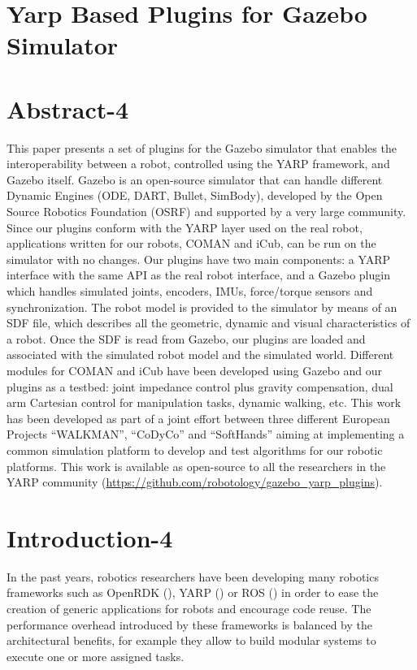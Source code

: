 \section{Yarp Based Plugins for Gazebo Simulator}

\section{Abstract-4}
This paper presents a set of plugins for the Gazebo simulator that enables the interoperability between a robot, controlled using the YARP framework, and Gazebo itself. Gazebo is an open-source simulator that can handle different Dynamic Engines (ODE, DART, Bullet, SimBody), developed by the Open Source Robotics Foundation (OSRF) and supported by a very large community. Since our plugins conform with the YARP layer used on the real robot, applications written for our robots, COMAN and iCub, can be run on the simulator with no changes. Our plugins have two main components: a YARP interface with the same API as the real robot interface, and a Gazebo plugin which handles simulated joints, encoders, IMUs, force/torque sensors and synchronization. The robot model is provided to the simulator by means of an SDF file, which describes all the geometric, dynamic and visual characteristics of a robot.
Once the SDF is read from Gazebo, our plugins are loaded and associated with the simulated robot model and the simulated world. Different modules for COMAN and iCub have been developed using Gazebo and our plugins as a testbed: joint impedance control plus gravity compensation, dual arm Cartesian control for manipulation tasks, dynamic walking, etc.
This work has been developed as part of a joint effort between three different European Projects ``WALKMAN'', ``CoDyCo'' and ``SoftHands'' aiming at implementing a common simulation platform to develop and test algorithms for our robotic platforms. This work is available as open-source to all the researchers in the YARP community (\url{https://github.com/robotology/gazebo_yarp_plugins}).  


\section{Introduction-4}
In the past years, robotics researchers have been developing many robotics frameworks such as OpenRDK (\cite{cace08rdk}), YARP (\cite{Metta:YARP:2006}) or ROS (\cite{ROS}) in order to ease the creation of generic applications for robots and encourage code reuse. The performance overhead introduced by these frameworks is balanced by the architectural benefits, for example they allow to build modular systems to execute one or more assigned tasks.

